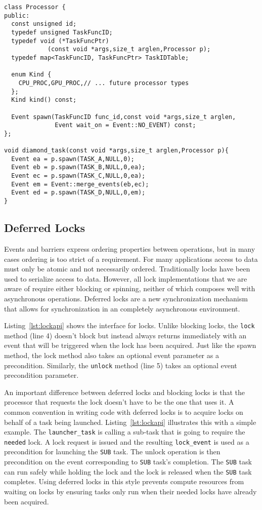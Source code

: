 \begin{lstlisting}[float={t},label={lst:procapi},caption={Processor Interface and Example.}]
class Processor {
public:
  const unsigned id;
  typedef unsigned TaskFuncID;
  typedef void (*TaskFuncPtr)
            (const void *args,size_t arglen,Processor p);
  typedef map<TaskFuncID, TaskFuncPtr> TaskIDTable;

  enum Kind {
    CPU_PROC,GPU_PROC,// ... future processor types
  };
  Kind kind() const;

  Event spawn(TaskFuncID func_id,const void *args,size_t arglen,
              Event wait_on = Event::NO_EVENT) const;
};

void diamond_task(const void *args,size_t arglen,Processor p){
  Event ea = p.spawn(TASK_A,NULL,0);
  Event eb = p.spawn(TASK_B,NULL,0,ea);
  Event ec = p.spawn(TASK_C,NULL,0,ea);
  Event em = Event::merge_events(eb,ec);
  Event ed = p.spawn(TASK_D,NULL,0,em);
}
\end{lstlisting}

\subsection{Deferred Locks}
\label{subsec:locks}

Events and barriers express ordering properties between operations, but in many
cases ordering is too strict of a requirement.  For many applications access to data must only be atomic and
not necessarily ordered.  Traditionally locks have been used to serialize access to
data.  However, all lock implementations that we are aware of require either blocking
or spinning, neither of which composes well with asynchronous operations.
Deferred locks are a new synchronization mechanism that allows for synchronization
in an completely asynchronous environment.  

Listing~\ref{lst:lockapi} shows the 
interface for locks.  Unlike blocking locks, the {\tt lock} method (line 4) doesn't
block but instead always returns immediately with an event that will be triggered
when the lock has been acquired.  Just like the spawn method, the lock method also 
takes an optional event parameter as a precondition.  Similarly, the {\tt unlock} 
method (line 5) takes an optional event precondition parameter.

An important difference between deferred locks and blocking locks is that the processor
that requests the lock doesn't have to be the one that uses it.  A common
convention in writing code with deferred locks is to acquire locks on behalf of a task being
launched.  Listing~\ref{lst:lockapi} illustrates this with a simple example.  The
{\tt launcher\_task} is calling a sub-task that is going to require the {\tt needed}
lock.  A lock request is issued and the resulting {\tt lock\_event} is used as
a precondition for launching the {\tt SUB} task.  The unlock operation is then
precondition on the event corresponding to {\tt SUB} task's completion.  The
{\tt SUB} task can run safely while holding the lock and the lock is released when the
{\tt SUB} task completes.  Using deferred locks in this style prevents 
compute resources from waiting on locks by ensuring tasks only run when their needed
locks have already been acquired.

